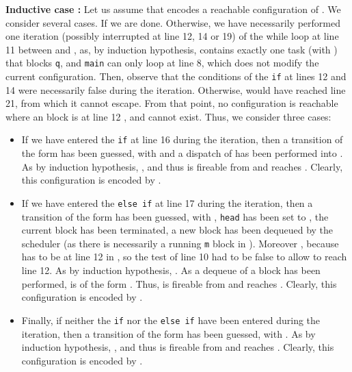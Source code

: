 \documentclass[runningheads,oribibl,]{article}
\newenvironment{proof}{\noindent{\it Proof.\hspace*{.5cm}}}{}
\newcommand{\qed}{\hfill}
\begin{document}
\begin{proof}
  \textbf{Inductive case :} Let us assume that
   encodes a reachable
  configuration  of . We consider several
  cases. If  we are done. Otherwise, we
  have necessarily performed one iteration (possibly interrupted at
  line 12, 14 or 19) of the while loop at line 11 between
   and
  , as, by induction
  hypothesis,  contains exactly one  task
  (with ) that blocks \texttt{q}, and \texttt{main}
  can only loop at line 8, which does not modify the current
  configuration. Then, observe that the conditions of the \texttt{if}
  at lines 12 and 14 were necessarily false during the
  iteration. Otherwise,  would have reached line 21, from which it
  cannot escape. From that point, no configuration is reachable where
  an  block is at line 12 , and  cannot exist.  Thus, we consider three cases:
  \begin{itemize}
  \item If we have entered the \texttt{if} at line 16 during the
    iteration, then a transition of the form  has been
    guessed, with  and a dispatch of  has been
    performed into . As
     by induction hypothesis, , and thus
     is fireable from  and reaches
    . Clearly, this configuration is encoded
    by .
  \item If we have entered the \texttt{else if} at line 17 during the
    iteration, then a transition of the form  has been
    guessed, with , \texttt{head} has been set to
    , the current  block has been terminated, a new block 
    has been dequeued by the scheduler (as there is necessarily a
    running \texttt{m} block in ). Moreover
    , because  has to be at line 12 in
    , so the test of line 10 had to be false to
    allow  to reach line 12. As
     by induction hypothesis, . As a dequeue
    of a block  has been performed,  is of the form
    . Thus,  is fireable from  and reaches . Clearly, this configuration is
    encoded by .
  \item Finally, if neither the \texttt{if} nor the \texttt{else if}
    have been entered during the iteration, then a transition of the
    form  has been guessed, with . As
     by induction hypothesis, , and thus
     is fireable from  and reaches
    . Clearly, this configuration is encoded by
    .\qed
  \end{itemize}
\end{proof}
\end{document}
